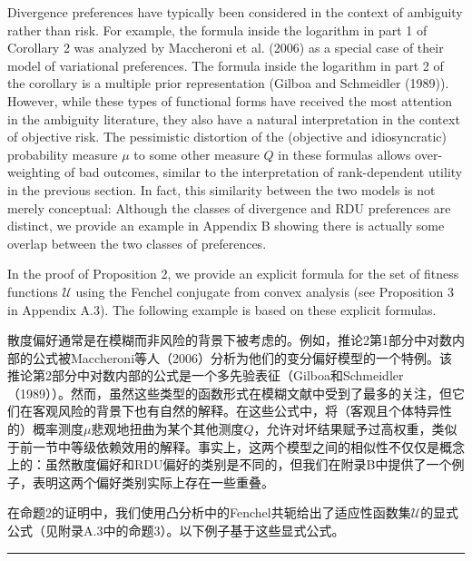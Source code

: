\documentclass[12pt,a4paper]{article}
\newenvironment{original}
  {\par\noindent\color{black}\smallskip}
  {\par\smallskip}
\newenvironment{translation}
  {\par\noindent\color{blue!70!black}\smallskip}
  {\par\medskip\hrule\medskip}
\begin{document}
\begin{original}
Divergence preferences have typically been considered in the context of ambiguity rather than risk. For example, the formula inside the logarithm in part 1 of Corollary 2 was analyzed by Maccheroni et al. (2006) as a special case of their model of variational preferences. The formula inside the logarithm in part 2 of the corollary is a multiple prior representation (Gilboa and Schmeidler (1989)). However, while these types of functional forms have received the most attention in the ambiguity literature, they also have a natural interpretation in the context of objective risk. The pessimistic distortion of the (objective and idiosyncratic) probability measure $\mu$ to some other measure $Q$ in these formulas allows over-weighting of bad outcomes, similar to the interpretation of rank-dependent utility in the previous section. In fact, this similarity between the two models is not merely conceptual: Although the classes of divergence and RDU preferences are distinct, we provide an example in Appendix B showing there is actually some overlap between the two classes of preferences.

In the proof of Proposition 2, we provide an explicit formula for the set of fitness functions $\mathcal{U}$ using the Fenchel conjugate from convex analysis (see Proposition 3 in Appendix A.3). The following example is based on these explicit formulas.
\end{original}
\begin{translation}
散度偏好通常是在模糊而非风险的背景下被考虑的。例如，推论2第1部分中对数内部的公式被Maccheroni等人（2006）分析为他们的变分偏好模型的一个特例。该推论第2部分中对数内部的公式是一个多先验表征（Gilboa和Schmeidler（1989））。然而，虽然这些类型的函数形式在模糊文献中受到了最多的关注，但它们在客观风险的背景下也有自然的解释。在这些公式中，将（客观且个体特异性的）概率测度$\mu$悲观地扭曲为某个其他测度$Q$，允许对坏结果赋予过高权重，类似于前一节中等级依赖效用的解释。事实上，这两个模型之间的相似性不仅仅是概念上的：虽然散度偏好和RDU偏好的类别是不同的，但我们在附录B中提供了一个例子，表明这两个偏好类别实际上存在一些重叠。

在命题2的证明中，我们使用凸分析中的Fenchel共轭给出了适应性函数集$\mathcal{U}$的显式公式（见附录A.3中的命题3）。以下例子基于这些显式公式。
\end{translation}
\end{document}
